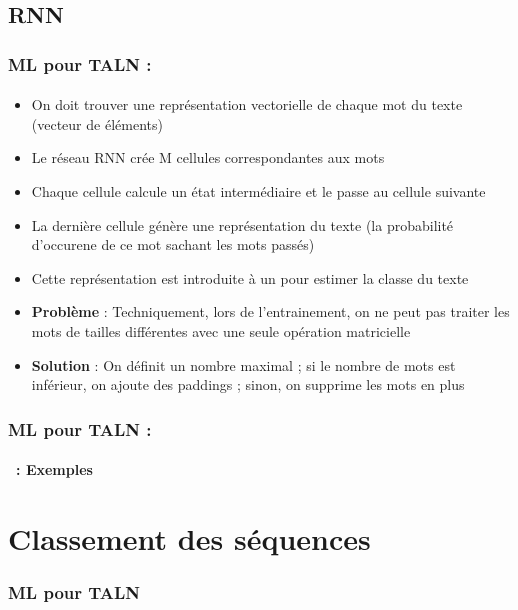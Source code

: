 \documentclass[xcolor=table]{beamer}
\begin{document}
\subsection{RNN}

\begin{frame}
	\frametitle{ML pour TALN : \insertsection}
	\framesubtitle{\insertsubsection}
	
	\begin{itemize}
		\item On doit trouver une représentation vectorielle de chaque mot du texte (vecteur de  éléments)
		\item Le réseau RNN crée M cellules correspondantes aux  mots
		\item Chaque cellule calcule un état intermédiaire et le passe au cellule suivante
		\item La dernière cellule génère une représentation du texte (la probabilité d'occurene de ce mot sachant les mots passés)
		\item Cette représentation est introduite à un  pour estimer la classe du texte
		\item \textbf{Problème} : Techniquement, lors de l'entrainement, on ne peut pas traiter les mots de tailles différentes avec une seule opération matricielle
		\item \textbf{Solution} : \textcolor{yellow!50}{On définit un nombre maximal ; si le nombre de mots est inférieur, on ajoute des paddings ; sinon, on supprime les mots en plus}
	\end{itemize}
	
\end{frame}

\begin{frame}
	\frametitle{ML pour TALN : \insertsection}
	\framesubtitle{\insertsubsection\ : Exemples}
	
	
\end{frame}

\section{Classement des séquences}

\begin{frame}
	\frametitle{ML pour TALN}
	\framesubtitle{\insertsection}
	
\end{frame}
\end{document}
